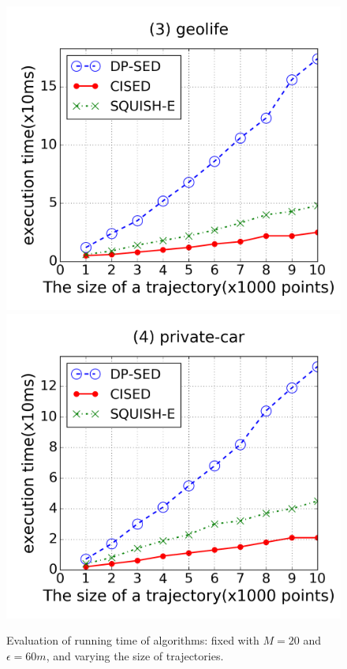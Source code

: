 \begin{figure}[tb!]
\includegraphics[scale = 0.250]{figures/Exp-time-size-geolife.png}
\includegraphics[scale = 0.250]{figures/Exp-time-size-private.png}
\vspace{-3ex}
\caption{\small Evaluation of running time of \lsa algorithms: fixed with $M=20$ and $\epsilon=60m$, and varying the size of trajectories.}
\label{fig:time-size}
\vspace{-2ex}
\end{figure}



